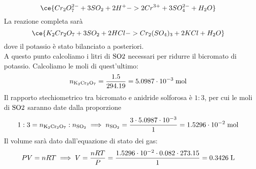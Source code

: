 \begin{soluzione}
    \begin{equation*}
        \ce{Cr_2O_7^{2-} + 3SO_2 + 2H^+ -> 2Cr^{3+} + 3SO_4^{2-} + H_2O}
    \end{equation*}
    La reazione completa sarà
    \begin{equation*}
        \ce{K_2Cr_2O_7 + 3SO_2 + 2HCl -> Cr_2(SO_4)_3 + 2KCl + H_2O}
    \end{equation*}
    dove il potassio è stato bilanciato a posteriori.\\
    A questo punto calcoliamo i litri di $\rm SO2$ necessari per ridurre il bicromato di potassio. Calcoliamo le moli di quest'ultimo:
    \begin{equation*}
        n_{\rm K_2Cr_2O_7}
        =\frac{1.5}{294.19}
        =5.0987 \cdot 10^{-3} \; \rm mol
    \end{equation*}
    Il rapporto stechiometrico tra bicromato e anidride solforosa è $1:3$, per cui le moli di $\rm SO2$ saranno date dalla proporzione
    \begin{equation*}
        1:3=n_{\rm K_2Cr_2O_7}:n_{\rm SO_2}
        \implies
        n_{\rm SO_2}=\frac{3 \cdot 5.0987 \cdot 10^{-3}}{1}
        =1.5296 \cdot 10^{-2} \; \rm mol
    \end{equation*}
    Il volume sarà dato dall'equazione di stato dei gas:
    \begin{equation*}
        PV=nRT
        \implies
        V=\frac{nRT}{P}
        =\frac{1.5296 \cdot 10^{-2} \cdot 0.082 \cdot 273.15}{1}
        =0.3426 \; \rm L
    \end{equation*}
\end{soluzione}

\newpage

